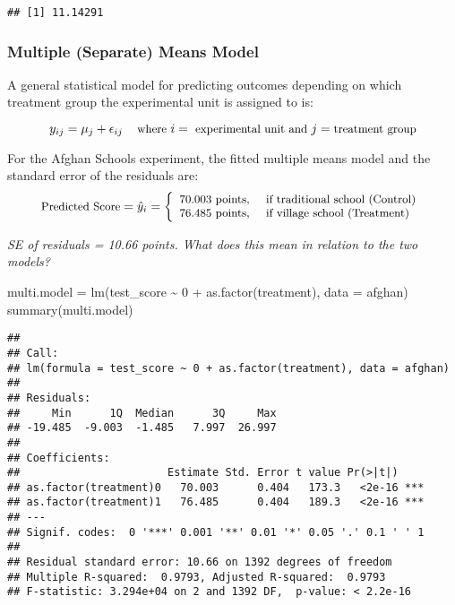 \documentclass[
]{article}
\newenvironment{Shaded}{\begin{snugshade}}{\end{snugshade}}
\newcommand{\AttributeTok}[1]{\textcolor[rgb]{0.77,0.63,0.00}{#1}}
\newcommand{\DecValTok}[1]{\textcolor[rgb]{0.00,0.00,0.81}{#1}}
\newcommand{\FunctionTok}[1]{\textcolor[rgb]{0.00,0.00,0.00}{#1}}
\newcommand{\NormalTok}[1]{#1}
\newcommand{\OtherTok}[1]{\textcolor[rgb]{0.56,0.35,0.01}{#1}}
\newcommand{\SpecialCharTok}[1]{\textcolor[rgb]{0.00,0.00,0.00}{#1}}
\begin{document}
\begin{verbatim}
## [1] 11.14291
\end{verbatim}

\hypertarget{multiple-separate-means-model}{%
\subsubsection{Multiple (Separate) Means
Model}\label{multiple-separate-means-model}}

A general statistical model for predicting outcomes depending on which
treatment group the experimental unit is assigned to is:

\[\small{y_{ij} = \mu_j + \epsilon_{ij} \,\,\,\,\,\text{ where } i =  \text{ experimental unit and } j = \text{treatment group}}\]

For the Afghan Schools experiment, the fitted multiple means model and
the standard error of the residuals are:
\[\small{\text{Predicted Score}} =  \hat{y}_i = \left\{
\begin{array}{ll}
      70.003 \text{ points, } &  \text{if traditional school (Control)} \\
      76.485 \text{ points, } &  \text{if village school (Treatment)}
\end{array} 
\right.  \]

\emph{SE of residuals = 10.66 points. What does this mean in relation to
the two models?}

\begin{Shaded}
\begin{Highlighting}[]
\NormalTok{multi.model }\OtherTok{=} \FunctionTok{lm}\NormalTok{(test\_score }\SpecialCharTok{\textasciitilde{}} \DecValTok{0} \SpecialCharTok{+} \FunctionTok{as.factor}\NormalTok{(treatment), }\AttributeTok{data =}\NormalTok{ afghan)}
\FunctionTok{summary}\NormalTok{(multi.model)}
\end{Highlighting}
\end{Shaded}

\begin{verbatim}
## 
## Call:
## lm(formula = test_score ~ 0 + as.factor(treatment), data = afghan)
## 
## Residuals:
##     Min      1Q  Median      3Q     Max 
## -19.485  -9.003  -1.485   7.997  26.997 
## 
## Coefficients:
##                       Estimate Std. Error t value Pr(>|t|)    
## as.factor(treatment)0   70.003      0.404   173.3   <2e-16 ***
## as.factor(treatment)1   76.485      0.404   189.3   <2e-16 ***
## ---
## Signif. codes:  0 '***' 0.001 '**' 0.01 '*' 0.05 '.' 0.1 ' ' 1
## 
## Residual standard error: 10.66 on 1392 degrees of freedom
## Multiple R-squared:  0.9793, Adjusted R-squared:  0.9793 
## F-statistic: 3.294e+04 on 2 and 1392 DF,  p-value: < 2.2e-16
\end{verbatim}
\end{document}
